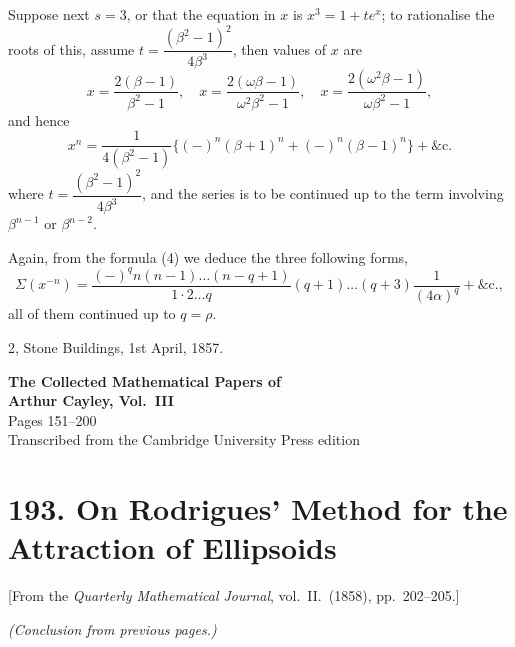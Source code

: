 \documentclass[11pt,a4paper]{book}
\begin{document}
Suppose next $s = 3$, or that the equation in $x$ is $x^3 = 1 + te^x$; to rationalise the roots of this, assume $t = \dfrac{(\beta^2 - 1)^2}{4\beta^3}$, then values of $x$ are
\[
x = \frac{2(\beta - 1)}{\beta^2 - 1}, \quad x = \frac{2(\omega\beta - 1)}{\omega^2\beta^2 - 1}, \quad x = \frac{2(\omega^2\beta - 1)}{\omega\beta^2 - 1},
\]
and hence
\[
x^n = \frac{1}{4(\beta^2 - 1)}\{(-)^n(\beta + 1)^n + (-)^n(\beta - 1)^n\} + \&\text{c.} \tag{15}
\]
where $t = \dfrac{(\beta^2 - 1)^2}{4\beta^3}$, and the series is to be continued up to the term involving $\beta^{n-1}$ or $\beta^{n-2}$.

Again, from the formula (4) we deduce the three following forms,
\[
\Sigma(x^{-n}) = \frac{(-)^q n(n - 1)\ldots(n - q + 1)}{1 \cdot 2 \ldots q}(q + 1)\ldots(q + 3)\frac{1}{(4\alpha)^q} + \&\text{c.}, \tag{16}
\]
all of them continued up to $q = \rho$.

\begin{flushright}
2, Stone Buildings, 1st April, 1857.
\end{flushright}
\clearpage


\begin{center}
{\Large\bfseries The Collected Mathematical Papers of\\[0.5em] Arthur Cayley, Vol.~III}\\[2em]
{\large Pages 151--200}\\[1em]
{\normalsize Transcribed from the Cambridge University Press edition}
\end{center}

\vspace{2em}


\newpage


\section*{193. On Rodrigues' Method for the Attraction of Ellipsoids}

\begin{center}
[From the \textit{Quarterly Mathematical Journal}, vol.~II.~(1858), pp.~202--205.]
\end{center}

\bigskip

\noindent\textit{(Conclusion from previous pages.)}
\end{document}
